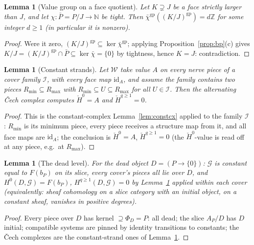 \documentclass[11pt]{article}
\newtheorem{lemma}[theorem]{Lemma}
\theoremstyle{definition}
\newcommand{\gp}{\mathrm{gp}}
\newcommand{\HH}{\check{H}}
\newcommand{\Z}{\mathbb{Z}}
\begin{document}
\begin{lemma}[Value group on a face quotient]\label{lem:dlemma}
Let $K\supsetneq J$ be a face strictly larger than $J$, and let
$\chi:\bar P=P/J\to\mathbb N$ be tight. Then
$\bar\chi^{\gp}((K/J)^{\gp})=d\Z$ for some integer $d\ge1$
\textup{(}in particular it is nonzero\textup{)}.
\end{lemma}

\begin{proof}
Were it zero, $(K/J)^{\gp}\subseteq\ker\bar\chi^{\gp}$; applying
Proposition~\ref{prop:bp}(c) gives
$K/J=(K/J)^{\gp}\cap\bar P\subseteq\ker\bar\chi=\{0\}$ by
tightness, hence $K=J$: contradiction.
\end{proof}

\begin{lemma}[Constant strands]\label{lem:const}
Let $\mathscr W$ take value $A$ on every nerve piece of a cover
family $\mathcal I$, with every face map $\mathrm{id}_A$, and
assume the family contains two pieces $R_{\min}\subseteq
R_{\max}$ with $R_{\min}\subseteq U\subseteq R_{\max}$ for all
$U\in\mathcal I$. Then the alternating \v{C}ech complex computes
$\HH^0=A$ and $\HH^{q\ge1}=0$.
\end{lemma}

\begin{proof}
This is the constant-complex Lemma~\ref{lem:constcx} applied to
the family $\mathcal I$: $R_{\min}$ is its minimum piece, every
piece receives a structure map from it, and all face maps are
$\mathrm{id}_A$; the conclusion is
$\HH^0=A$, $\HH^{q\ge1}=0$ (the $\HH^0$-value is read off at any
piece, e.g.\ at $R_{\max}$).
\end{proof}


\begin{lemma}[The dead level]\label{lem:dead}
For the dead object $D=(P\to\{0\})$: $\mathcal G$ is constant equal
to $F(b_P)$ on its slice, every cover's pieces all lie over $D$, and
$H^0(D,\mathcal G)=F(b_P)$, $H^{q\ge1}(D,\mathcal G)=0$ by
Lemma~\textup{\ref{lem:const}} applied within each cover
\textup{(}equivalently: sheaf cohomology on a slice category with an
initial object, on a constant sheaf, vanishes in positive
degrees\textup{)}.
\end{lemma}

\begin{proof}
Every piece over $D$ has kernel $\supseteq\Phi_D=P$: all dead; the
slice $A_P/D$ has $D$ initial; compatible systems are pinned by
identity transitions to constants; the \v{C}ech complexes are the
constant-strand ones of Lemma~\ref{lem:const}.
\end{proof}
\end{document}

